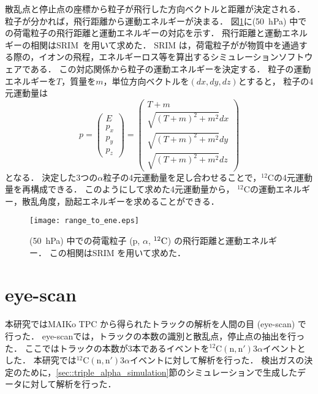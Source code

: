 \documentclass[../master]{subfiles}
\begin{document}
散乱点と停止点の座標から粒子が飛行した方向ベクトルと距離が決定される．
粒子が分かれば，飛行距離から運動エネルギーが決まる．
図\ref{fig::range_to_ene_alpha}に\Methane (\SI{50}{\hecto\pascal}) 中での荷電粒子の飛行距離と運動エネルギーの対応を示す．
飛行距離と運動エネルギーの相関はSRIM~\cite{srim}を用いて求めた．
SRIM は，荷電粒子がが物質中を通過する際の，イオンの飛程，エネルギーロス等を算出するシミュレーションソフトウェアである．
この対応関係から粒子の運動エネルギーを決定する．
粒子の運動エネルギーを$T$，質量を$m$，単位方向ベクトルを$(dx, dy, dz)$とすると，
粒子の4元運動量は
\begin{equation}
  p =
  \begin{pmatrix}
    E \\ p_{x} \\ p_{y} \\ p_{z}
  \end{pmatrix}
  =
  \begin{pmatrix}
    T + m \\ \sqrt{(T+m)^2 + m^2} dx \\ \sqrt{(T+m)^2 + m^2} dy \\ \sqrt{(T+m)^2 + m^2} dz
  \end{pmatrix}
  \label{eq::momentum_vector}
\end{equation}
となる．
決定した3つの$\alpha$粒子の4元運動量を足し合わせることで，${}^{12}\mathrm{C}$の4元運動量を再構成できる．
このようにして求めた4元運動量から，
${}^{12}\mathrm{C}$の運動エネルギー，散乱角度，励起エネルギーを求めることができる．
\begin{figure}
  \centering
  \texttt{[image: range\_to\_ene.eps]}
  \caption[\Methane (\SI{50}{\hecto\pascal}) 中での荷電粒子 (p, $\alpha$, ${}^{12}\rm{C}$) の飛行距離と運動エネルギー．]
          {\Methane (\SI{50}{\hecto\pascal}) 中での荷電粒子 (p, $\alpha$, ${}^{12}\rm{C}$) の飛行距離と運動エネルギー．
            この相関はSRIM を用いて求めた．
          }
  \label{fig::range_to_ene_alpha}
\end{figure}


\section{eye-scan}
本研究ではMAIKo TPC から得られたトラックの解析を人間の目 (eye-scan) で行った．
eye-scanでは，トラックの本数の識別と散乱点，停止点の抽出を行った．
ここではトラックの本数が3本であるイベントを${}^{12}\mathrm{C}(\mathrm{n},\mathrm{n}')3\alpha$イベントとした．
本研究では${}^{12}\mathrm{C}(\mathrm{n},\mathrm{n}')3\alpha$イベントに対して解析を行った．
検出ガスの決定のために，\ref{sec::triple_alpha_simulation}節のシミュレーションで生成したデータに対して解析を行った．
\end{document}
